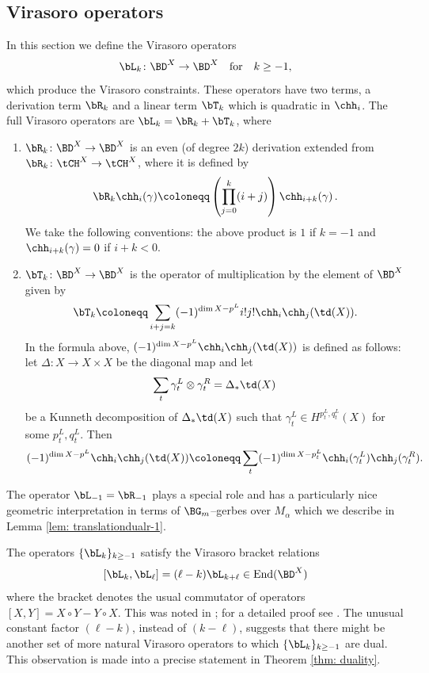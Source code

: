\subsection{Virasoro operators}

\label{sec: Virarosorops}

In this section we define the Virasoro operators
\[\bL_k\colon \BD^X\to \BD^X\quad\textnormal{for}\quad k\geq -1,\]which produce the Virasoro constraints. These operators have two terms, a derivation term $\bR_k$ and a linear term $\bT_k$ which is quadratic in $\chh_i$. The full Virasoro operators are $\bL_k=\bR_k+\bT_k$, where
\begin{enumerate}
\item
$\bR_k \colon \BD^X\to \BD^X$ is an even (of degree $2k$) derivation extended from $\bR_k\colon \tCH^X\to\tCH^X$, where it is defined by
\[\bR_k \chh_i(\gamma)\coloneqq\left(\prod_{j=0}^k (i+j)\right)\chh_{i+k}(\gamma)\,.\]
We take the following conventions: the above product is $1$ if $k=-1$ and $\chh_{i+k}(\gamma)=0$ if $i+k<0$.
\item $\bT_k\colon \BD^X\to \BD^X$ is the operator of multiplication by the element of $\BD^X$ given by
\[\bT_k\coloneqq\sum_{i+j=k}(-1)^{\dim X-p^L}i!j!\chh_i\chh_j(\td(X)).\]
In the formula above, $(-1)^{\dim X-p^L}\chh_i\chh_j(\td(X))$ is defined as follows: let $\Delta\colon X\to X\times X$ be the diagonal map and let
\[\sum_{t}\gamma_t^L\otimes \gamma_t^R=\Delta_\ast \td(X)\]
be a Kunneth decomposition of  $\Delta_\ast\td(X)$ such that $\gamma_t^L\in H^{p^L_t, q^L_t}(X)$ for some $p_t^L, q_t^L$. Then
\[(-1)^{\dim X-p^L}\chh_i\chh_j(\td(X))\coloneqq \sum_{t}(-1)^{\dim X-p_t^L}\chh_i(\gamma_t^L)\chh_j(\gamma_t^R).\]
\end{enumerate}
\begin{remark}
\notready
The operator $\bL_{-1}=\bR_{-1}$ plays a special role and has a particularly nice geometric interpretation in terms of $\BG_m$--gerbes over $M_{\alpha}$ which we describe in Lemma \ref{lem: translationdualr-1}.
\end{remark}

The operators $\{\bL_k\}_{k\geq -1}$ satisfy the Virasoro bracket relations
\[[\bL_k, \bL_\ell]=(\ell-k)\bL_{k+\ell}\in \textup{End}(\BD^X)\]
where the bracket denotes the usual commutator of operators $[X,Y]=X\circ Y-Y\circ X$.
This was noted in \cite{moop}; for a detailed proof see \cite[Proposition 2.10]{bree}. The unusual constant factor $(\ell-k)$, instead of $(k-\ell)$, suggests that there might be another set of more natural Virasoro operators to which $\{\bL_k\}_{k\geq -1}$ are dual. This observation is made into a precise statement in Theorem \ref{thm: duality}.

